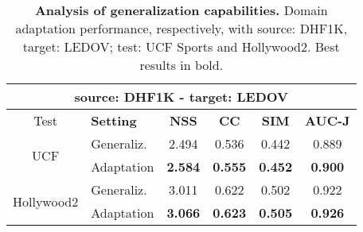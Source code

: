 \begin{table}[ht!]
    \centering
    \small\addtolength{\tabcolsep}{-2pt}
    \begin{tabular}{clcccc}
    \toprule
    \multicolumn{6}{c}{\textbf{source: DHF1K -  target: LEDOV }}\\
    \midrule
    Test & \textbf{Setting} & \textbf{NSS} & \textbf{CC} & \textbf{SIM} & \textbf{AUC-J} \\
    \midrule
    \multirow{2}{*}{UCF} & Generaliz.   & 2.494 & 0.536 & 0.442  & 0.889            \\
    & Adaptation   &  \textbf{2.584}  &  \textbf{0.555}  &  \textbf{0.452} & \textbf{0.900}      \\
    \midrule
    \multirow{2}{*}{Hollywood2} & Generaliz.               & 3.011            & 0.622            & 0.502 & 0.922 \\
    & Adaptation     & \textbf{3.066}   & \textbf{0.623} &  \textbf{0.505}  & \textbf{0.926}   \\
    \bottomrule
    \end{tabular}
    \caption{\textbf{Analysis of generalization capabilities.} Domain adaptation performance, respectively, with source: DHF1K, target: LEDOV; test: UCF Sports and Hollywood2. Best results in bold.}
    \label{tab:dhf1k-ledov}
\end{table}

